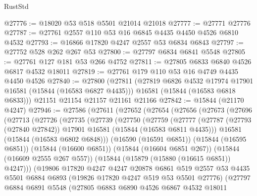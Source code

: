 \begin{lexlean}{RustStd}
\begin{coremodule}
@27776 := @18020 @53 @518 @5501 @21014 @21018
@27777 := @27771 @27776
@27787 := @27761 @2557 @110 @53 @16 @6845 @4435 @4450 @4526 @6810 @4532
@27793 := @16866 @17820 @4247 @2557 @53 @6834 @6843
@27797 := @27752 @528 @262 @267 @53
@27800 := @27797 @6834 @6841 @5548
@27805 := @27761 @127 @181 @53 @266 @4752
@27811 := @27805 @6833 @6840 @4526 @6817 @4532 @18011
@27819 := @27761 @179 @110 @53 @16 @4749 @4435 @4450 @4526
@27840 := @27800
    (@27811
      (@27819 @6826 @4532 @17974 @17901 @16581 (@15844 (@16583 @6827 @4435)))
      @16581
      (@15844 (@16583 @6818 @6833)))
    @21151
    @21154
    @21157
    @21161
    @21166
@27842 := @15844 (@21170 @4247)
@27946 := @27586
    (@27611
      (@27652
        (@27654
          (@27656
            (@27673
              (@27696
                (@27713
                  (@27726
                    (@27735
                      (@27739
                        (@27750
                          (@27759
                            (@27777
                              (@27787
                                (@27793 (@27840 @27842))
                                @17901
                                @16581
                                (@15844 (@16583 @6811 @4435)))
                              @16581
                              (@15844 (@16583 @6802 @6848)))
                            (@16590 (@16591 @6851))
                            (@15844 (@16595 @6851))
                            (@15844 (@16600 @6851))
                            (@15844 (@16604 @6851 @267))
                            (@15844 (@16609 @2555 @267 @557))
                            (@15844 (@15879 (@15880 (@16615 @6851)) @4247)))
                          (@19806
                            @17820
                            @4247
                            @4247
                            @20878
                            @6861
                            @519
                            @2557
                            @53
                            @4435
                            @5501
                            @6884
                            @6893
                            (@19826 @17820 @4247 @519 @53 @5501 @27776)
                            (@27797
                              @6884
                              @6891
                              @5548
                              (@27805
                                @6883
                                @6890
                                @4526
                                @6867
                                @4532
                                @18011

\end{coremodule}
\end{lexlean}

